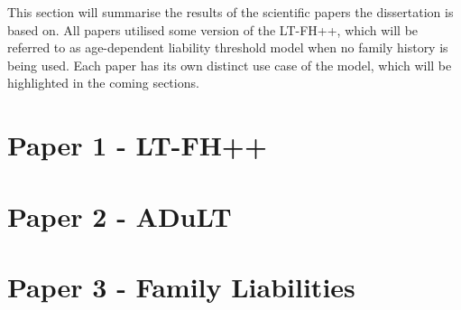 


This section will summarise the results of the scientific papers the dissertation is based on. All papers utilised some version of the LT-FH++, which will be referred to as age-dependent liability threshold model when no family history is being used. Each paper has its own distinct use case of the model, which will be highlighted in the coming sections.

\section{Paper 1 - LT-FH++}

\newpage

\section{Paper 2 - ADuLT}

\newpage

\section{Paper 3 - Family Liabilities}

\newpage



